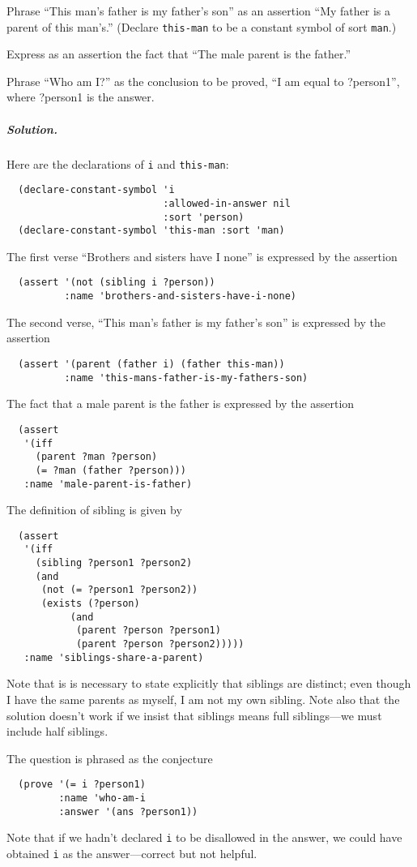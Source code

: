 Phrase ``This man's father is my father's son'' as an assertion ``My
father is a parent of this man's.''  (Declare {\tt this-man} to be a
constant symbol of sort {\tt man}.)

Express as an assertion the fact that ``The male parent is the
father.''

Phrase ``Who am I?'' as the conclusion to be proved, ``I am equal to
?person1'', where ?person1 is the answer.

\subparagraph{Solution.}
Here are the declarations of {\tt i} and {\tt this-man}:
\begin{verbatim}
  (declare-constant-symbol 'i
                           :allowed-in-answer nil
                           :sort 'person)
  (declare-constant-symbol 'this-man :sort 'man)
\end{verbatim}
The first verse ``Brothers and sisters have I
none'' is expressed by the assertion
\begin{verbatim}
  (assert '(not (sibling i ?person))
          :name 'brothers-and-sisters-have-i-none)
\end{verbatim}
The second verse, ``This man's father is my father's son'' is
expressed by the assertion
\begin{verbatim}
  (assert '(parent (father i) (father this-man))
          :name 'this-mans-father-is-my-fathers-son)
\end{verbatim}
The fact that a male parent is the father is expressed by the
assertion
\begin{verbatim}
  (assert
   '(iff
     (parent ?man ?person)
     (= ?man (father ?person)))
   :name 'male-parent-is-father)
\end{verbatim}
The definition of sibling is given by
\begin{verbatim}
  (assert
   '(iff
     (sibling ?person1 ?person2)
     (and
      (not (= ?person1 ?person2))
      (exists (?person)
           (and
            (parent ?person ?person1)
            (parent ?person ?person2)))))
   :name 'siblings-share-a-parent)
\end{verbatim}
Note that is is necessary to state explicitly that siblings are
distinct; even though I have the same parents as myself, I am not my
own sibling.  Note also that the solution doesn't work if we insist
that siblings means full siblings---we must include half siblings.

The question is phrased as the conjecture
\begin{verbatim}
  (prove '(= i ?person1)
         :name 'who-am-i
         :answer '(ans ?person1))
\end{verbatim}
Note that if we hadn't declared {\tt i} to be disallowed in the
answer, we could have obtained {\tt i} as the answer---correct but not
helpful.

